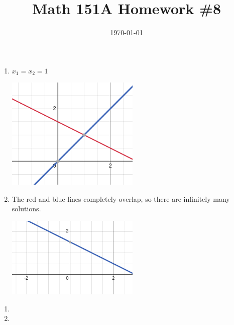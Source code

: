 \documentclass{article}
\date{\today}
\title{Math 151A Homework \#8}
\begin{document}
\maketitle

\begin{prob}
\end{prob}
\begin{enumerate}[label=(\alph*)]
    \item $x_1=x_2=1$
    \begin{center}
        \includegraphics[width=0.5\textwidth]{1a.png}
    \end{center}
\item The red and blue lines completely overlap, so there are infinitely many solutions.
    \begin{center}
        \includegraphics[width=0.5\textwidth]{1b.png}
    \end{center}
\end{enumerate}


\bigskip
\begin{prob}
\end{prob}
\begin{enumerate}[label=(\alph*)]
    \item
    \item
\end{enumerate}
\end{document}
